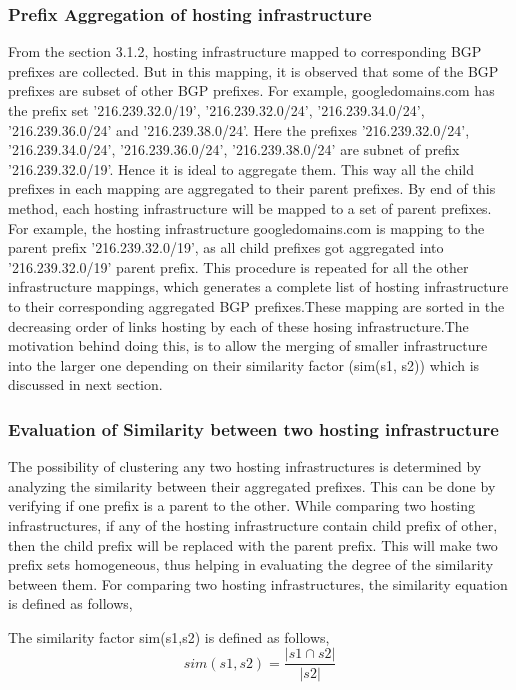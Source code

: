 \subsubsection{Prefix Aggregation of hosting infrastructure}
From the section 3.1.2, hosting infrastructure mapped to corresponding BGP prefixes are collected. But in this mapping, it is observed that some of the BGP prefixes are subset of other BGP prefixes. For example, googledomains.com has the prefix set ’216.239.32.0/19’, ’216.239.32.0/24’, ’216.239.34.0/24’, ’216.239.36.0/24’ and ’216.239.38.0/24’. Here the prefixes ’216.239.32.0/24’, ’216.239.34.0/24’, ’216.239.36.0/24’, ’216.239.38.0/24’ are subnet of prefix ’216.239.32.0/19’. Hence it is ideal to aggregate them. This way all the child prefixes in each mapping are aggregated to their parent prefixes. By end of this method, each hosting infrastructure will be mapped to a set of parent prefixes. For example, the hosting infrastructure googledomains.com is mapping to the parent prefix ’216.239.32.0/19’, as all child prefixes got aggregated into '216.239.32.0/19' parent prefix. This procedure is repeated for all the other infrastructure mappings, which generates a complete list of hosting infrastructure to their corresponding aggregated BGP prefixes.These mapping are sorted in the decreasing order of links hosting by each of these hosing infrastructure.The motivation behind doing this, is to allow the merging of smaller infrastructure into the larger one depending on their similarity factor (sim(s1, s2)) which is discussed in next section.

\subsubsection{Evaluation of Similarity between two hosting infrastructure}
The possibility of clustering any two hosting infrastructures is determined by analyzing the similarity between their aggregated prefixes. This can be done by verifying if one prefix is a parent to the other. While comparing two hosting infrastructures, if any of the hosting infrastructure contain child prefix of other, then the child prefix will be replaced with the parent prefix. This will make two prefix sets homogeneous, thus helping in evaluating the degree of the similarity between them. For comparing two hosting infrastructures, the similarity equation is defined as follows,

The similarity factor sim(s1,s2) is defined as follows,
\begin{equation}
sim(s1, s2)= \frac{|s1 \cap s2|}{|s2|}
\end{equation}

